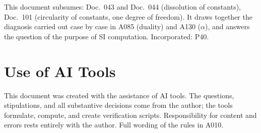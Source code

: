 This document subsumes: Doc.~043 and Doc.~044 (dissolution of constants), Doc.~101
(circularity of constants, one degree of freedom). It draws together the diagnosis
carried out case by case in A085 (duality) and A130 ($\alpha$), and answers the
question of the purpose of SI computation. Incorporated: P40.

\section{Use of AI Tools}

This document was created with the assistance of AI tools. The questions,
stipulations, and all substantive decisions come from the author; the tools
formulate, compute, and create verification scripts.
Responsibility for content and errors rests entirely with the author.
Full wording of the rules in A010.
